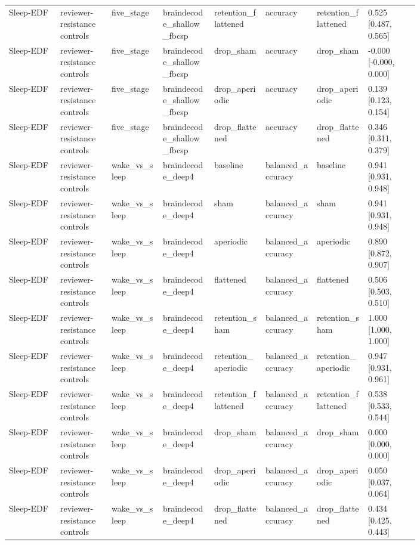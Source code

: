 \begin{longtable}{p{0.10\linewidth}p{0.10\linewidth}p{0.10\linewidth}p{0.10\linewidth}p{0.10\linewidth}p{0.10\linewidth}p{0.10\linewidth}p{0.10\linewidth}}
Sleep-EDF & reviewer-resistance controls & five\_stage & braindecode\_shallow\_fbcsp & retention\_flattened & accuracy & retention\_flattened & 0.525 [0.487, 0.565]\\
Sleep-EDF & reviewer-resistance controls & five\_stage & braindecode\_shallow\_fbcsp & drop\_sham & accuracy & drop\_sham & -0.000 [-0.000, 0.000]\\
Sleep-EDF & reviewer-resistance controls & five\_stage & braindecode\_shallow\_fbcsp & drop\_aperiodic & accuracy & drop\_aperiodic & 0.139 [0.123, 0.154]\\
Sleep-EDF & reviewer-resistance controls & five\_stage & braindecode\_shallow\_fbcsp & drop\_flattened & accuracy & drop\_flattened & 0.346 [0.311, 0.379]\\
Sleep-EDF & reviewer-resistance controls & wake\_vs\_sleep & braindecode\_deep4 & baseline & balanced\_accuracy & baseline & 0.941 [0.931, 0.948]\\
Sleep-EDF & reviewer-resistance controls & wake\_vs\_sleep & braindecode\_deep4 & sham & balanced\_accuracy & sham & 0.941 [0.931, 0.948]\\
Sleep-EDF & reviewer-resistance controls & wake\_vs\_sleep & braindecode\_deep4 & aperiodic & balanced\_accuracy & aperiodic & 0.890 [0.872, 0.907]\\
Sleep-EDF & reviewer-resistance controls & wake\_vs\_sleep & braindecode\_deep4 & flattened & balanced\_accuracy & flattened & 0.506 [0.503, 0.510]\\
Sleep-EDF & reviewer-resistance controls & wake\_vs\_sleep & braindecode\_deep4 & retention\_sham & balanced\_accuracy & retention\_sham & 1.000 [1.000, 1.000]\\
Sleep-EDF & reviewer-resistance controls & wake\_vs\_sleep & braindecode\_deep4 & retention\_aperiodic & balanced\_accuracy & retention\_aperiodic & 0.947 [0.931, 0.961]\\
Sleep-EDF & reviewer-resistance controls & wake\_vs\_sleep & braindecode\_deep4 & retention\_flattened & balanced\_accuracy & retention\_flattened & 0.538 [0.533, 0.544]\\
Sleep-EDF & reviewer-resistance controls & wake\_vs\_sleep & braindecode\_deep4 & drop\_sham & balanced\_accuracy & drop\_sham & 0.000 [0.000, 0.000]\\
Sleep-EDF & reviewer-resistance controls & wake\_vs\_sleep & braindecode\_deep4 & drop\_aperiodic & balanced\_accuracy & drop\_aperiodic & 0.050 [0.037, 0.064]\\
Sleep-EDF & reviewer-resistance controls & wake\_vs\_sleep & braindecode\_deep4 & drop\_flattened & balanced\_accuracy & drop\_flattened & 0.434 [0.425, 0.443]\\

\end{longtable}
